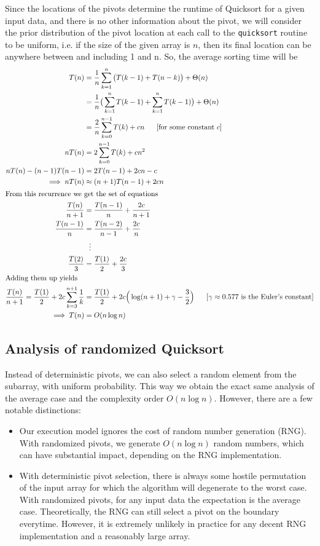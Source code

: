 \documentclass[]{finalproject}
\begin{document}
Since the locations of the pivots determine the runtime of Quicksort for a given input data, and there is no other information about the pivot,
we will consider the prior distribution of the pivot location at each call to the \texttt{quicksort} routine to be uniform,
i.e. if the size of the given array is $n$, then its final location can be anywhere between and including 1 and n. So, the average sorting time will be
\begin{align*}
T(n) &= \frac{1}{n}\sum_{k=1}^{n}\big(T(k-1) + T(n-k)\big) + \Theta(n) \\
&= \frac{1}{n}\big(\sum_{k=1}^{n}T(k-1) + \sum_{k=1}^{n}T(k-1)\big) + \Theta(n) \\
&= \frac{2}{n}\sum_{k=0}^{n-1}T(k) + cn ~~~~~[\text{for some constant $c$}]\\
nT(n) &= 2\sum_{k=0}^{n-1}T(k) + cn^2 \\
nT(n) - (n-1)T(n-1) &= 2T(n-1) + 2cn - c \\
\implies nT(n) &\approx (n+1)T(n-1) + 2cn \\
\shortintertext{From this recurrence we get the set of equations}
\frac{T(n)}{n+1} &= \frac{T(n-1)}{n} + \frac{2c}{n+1} \\
\frac{T(n-1)}{n} &= \frac{T(n-2)}{n-1} + \frac{2c}{n} \\
&~~\vdots \\
\frac{T(2)}{3} &= \frac{T(1)}{2} + \frac{2c}{3} \\
\shortintertext{Adding them up yields}
\frac{T(n)}{n+1} =  \frac{T(1)}{2} + 2c \sum_{k=3}^{n+1}\frac{1}{k} &= \frac{T(1)}{2} + 2c\Big(\log(n+1) + \gamma - \frac{3}{2}\Big) ~~~~~[\text{$\gamma \approx 0.577$ is the Euler's constant}] \\
\implies T(n) &= O(n\log n)
\end{align*}

\subsection{Analysis of randomized Quicksort}

Instead of deterministic pivots, we can also select a random element from the subarray, with uniform probability.
This way we obtain the exact same analysis of the average case and the complexity order $O(n\log n)$. However, there are a few notable distinctions:
\begin{itemize}
\item Our execution model ignores the cost of random number generation (RNG).
With randomized pivots, we generate $O(n\log n)$ random numbers, which can have substantial impact, depending on the RNG implementation.
\item With deterministic pivot selection, there is always some hostile permutation of the input array for which the algorithm will degenerate to the worst case.
With randomized pivots, for any input data the expectation is the average case.
Theoretically, the RNG can still select a pivot on the boundary everytime.
However, it is extremely unlikely in practice for any decent RNG implementation and a reasonably large array.
\end{itemize}
\end{document}
